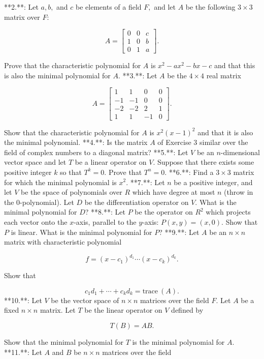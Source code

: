 

**2.**: Let \(a,b,\) and \(c\) be elements of a field \(F,\) and let \(A\) be the following \(3\times 3\) matrix over \(F\):

\[A=\begin{bmatrix}0&0&c\\ 1&0&b\\ 0&1&a\end{bmatrix}.\]

Prove that the characteristic polynomial for \(A\) is \(x^{2}-ax^{2}-bx-c\) and that this is also the minimal polynomial for \(A.\)
**3.**: Let \(A\) be the \(4\times 4\) real matrix

\[A=\begin{bmatrix}1&1&0&0\\ -1&-1&0&0\\ -2&-2&2&1\\ 1&1&-1&0\end{bmatrix}.\]

Show that the characteristic polynomial for \(A\) is \(x^{2}(x-1)^{2}\) and that it is also the minimal polynomial.
**4.**: Is the matrix \(A\) of Exercise 3 similar over the field of complex numbers to a diagonal matrix?
**5.**: Let \(V\) be an \(n\)-dimensional vector space and let \(T\) be a linear operator on \(V.\) Suppose that there exists some positive integer \(k\) so that \(T^{k}=0.\) Prove that \(T^{n}=0.\)
**6.**: Find a \(3\times 3\) matrix for which the minimal polynomial is \(x^{2}.\)
**7.**: Let \(n\) be a positive integer, and let \(V\) be the space of polynomials over \(R\) which have degree at most \(n\) (throw in the \(0\)-polynomial). Let \(D\) be the differentiation operator on \(V.\) What is the minimal polynomial for \(D\)?
**8.**: Let \(P\) be the operator on \(R^{2}\) which projects each vector onto the \(x\)-axis, parallel to the \(y\)-axis: \(P(x,y)=(x,0).\) Show that \(P\) is linear. What is the minimal polynomial for \(P\)?
**9.**: Let \(A\) be an \(n\times n\) matrix with characteristic polynomial

\[f=(x-c_{1})^{d_{1}}\cdots(x-c_{k})^{d_{k}}.\]

Show that

\[c_{1}d_{1}+\cdots+c_{k}d_{k}=\text{trace}\ (A).\]
**10.**: Let \(V\) be the vector space of \(n\times n\) matrices over the field \(F.\) Let \(A\) be a fixed \(n\times n\) matrix. Let \(T\) be the linear operator on \(V\) defined by

\[T(B)=AB.\]

Show that the minimal polynomial for \(T\) is the minimal polynomial for \(A\).
**11.**: Let \(A\) and \(B\) be \(n\times n\) matrices over the field \